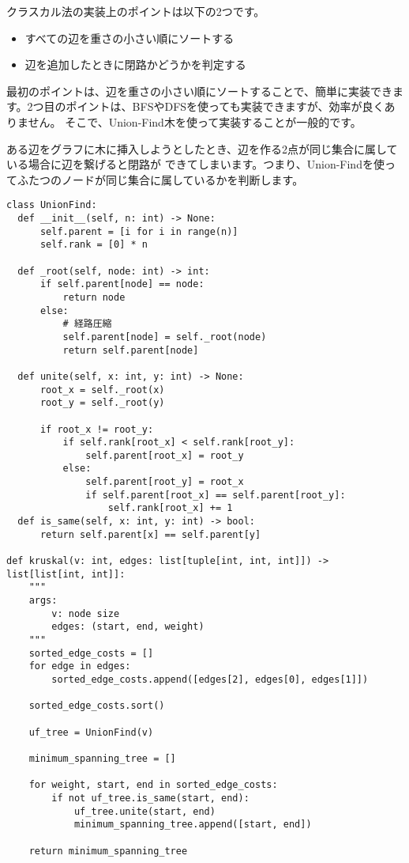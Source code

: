 \vspace{0.5cm}

クラスカル法の実装上のポイントは以下の2つです。

\begin{itemize}
  \item すべての辺を重さの小さい順にソートする
  \item 辺を追加したときに閉路かどうかを判定する
\end{itemize}

最初のポイントは、辺を重さの小さい順にソートすることで、簡単に実装できます。2つ目のポイントは、BFSやDFSを使っても実装できますが、効率が良くありません。
そこで、Union-Find木を使って実装することが一般的です。

ある辺をグラフに木に挿入しようとしたとき、辺を作る2点が同じ集合に属している場合に辺を繋げると閉路が
できてしまいます。つまり、Union-Findを使ってふたつのノードが同じ集合に属しているかを判断します。

\begin{lstlisting}[caption=クラスカル法の実装, label=kruskal, frame=TRBL, label={kruskal}]
class UnionFind:
  def __init__(self, n: int) -> None:
      self.parent = [i for i in range(n)]
      self.rank = [0] * n
  
  def _root(self, node: int) -> int:
      if self.parent[node] == node:
          return node
      else:
          # 経路圧縮
          self.parent[node] = self._root(node)
          return self.parent[node]
  
  def unite(self, x: int, y: int) -> None:
      root_x = self._root(x)
      root_y = self._root(y)
      
      if root_x != root_y:
          if self.rank[root_x] < self.rank[root_y]:
              self.parent[root_x] = root_y
          else:
              self.parent[root_y] = root_x
              if self.parent[root_x] == self.parent[root_y]:
                  self.rank[root_x] += 1
  def is_same(self, x: int, y: int) -> bool:
      return self.parent[x] == self.parent[y]

def kruskal(v: int, edges: list[tuple[int, int, int]]) -> list[list[int, int]]:
    """
    args:
        v: node size
        edges: (start, end, weight)
    """
    sorted_edge_costs = []
    for edge in edges:
        sorted_edge_costs.append([edges[2], edges[0], edges[1]])
    
    sorted_edge_costs.sort()
    
    uf_tree = UnionFind(v)
    
    minimum_spanning_tree = []
    
    for weight, start, end in sorted_edge_costs:
        if not uf_tree.is_same(start, end):
            uf_tree.unite(start, end)
            minimum_spanning_tree.append([start, end])
    
    return minimum_spanning_tree
\end{lstlisting}

